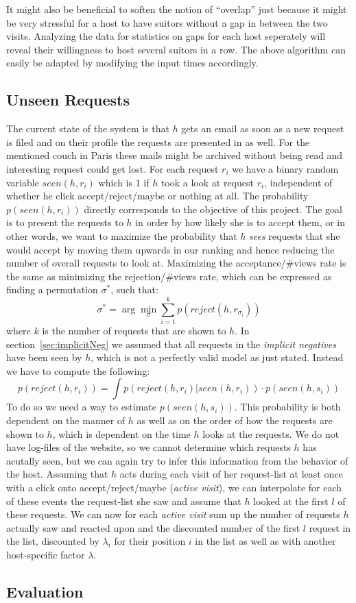 \documentclass[11pt]{article}
\begin{document}
It might also be beneficial to soften the notion of ``overlap'' just because it might be very stressful for a host to have suitors without a gap in between the two visits. Analyzing the data for statistics on gaps for each host seperately will reveal their willingness to host several suitors in a row. The above algorithm can easily be adapted by modifying the input times accordingly.

\subsection{Unseen Requests}
\label{sec:unseen}
The current state of the system is that $h$ gets an email as soon as a new request is filed and on their profile the requests are presented in  as well. For the mentioned couch in Paris these mails might be archived without being read and interesting request could get lost. For each request $r_i$ we have a binary random variable $seen(h, r_i)$ which is $1$ if $h$ took a look at request $r_i$, independent of whether he click accept/reject/maybe or nothing at all. The probability $p(seen(h,r_i))$ directly corresponds to the objective of this project. The goal is to present the requests to $h$ in order by how likely she is to accept them, or in other words, we want to maximize the probability that $h$ \textit{sees} requests that she would accept by moving them upwards in our ranking and hence reducing the number of overall requests to look at. Maximizing the acceptance/\#views rate is the same as minimizing the rejection/\#views rate, which can be expressed as finding a permutation $\sigma^*$, such that:
$$\sigma^* = \arg\min_{\sigma}\sum_{i=1}^k p(reject(h, r_{\sigma_i}))$$
where $k$ is the number of requests that are shown to $h$. 
In section~\ref{sec:implicitNeg} we assumed that all requests in the \textit{implicit negatives} have been seen by $h$, which is not a perfectly valid model as just stated. Instead we have to compute the following:
$$p(reject(h, r_i)) = \int p(reject(h, r_i)|seen(h, r_i))\cdot p(seen(h, s_i))$$
To do so we need a way to estimate $p(seen(h,s_i))$. This probability is both dependent on the manner of $h$ as well as on the order of how the requests are shown to $h$, which is dependent on the time $h$ looks at the requests. We do not have log-files of the website, so we cannot determine which requests $h$ has acutally seen, but we can again try to infer this information from the behavior of the host. Assuming that $h$ acts during each visit of her request-list at least once with a click onto accept/reject/maybe (\textit{active visit}), we can interpolate for each of these events the request-list she saw and assume that $h$ looked at the first $l$ of these requests. We can now for each \textit{active visit} sum up the number of requests $h$ actually saw and reacted upon and the discounted number of the first $l$ request in the list, discounted by $\lambda_i$ for their position $i$ in the list as well as with another host-specific factor $\lambda$.

\subsection{Evaluation}


\small

\end{document}
